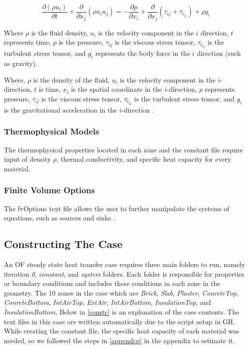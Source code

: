 \begin{equation}
\frac{\partial (\rho u_i)}{\partial t} + \frac{\partial}{\partial x_j} \left( \rho u_i u_j \right) = -\frac{\partial p}{\partial x_i} + \frac{\partial}{\partial x_j} \left( \tau_{ij} + \tau_{t_{ij}} \right) + \rho g_i
\end{equation}

Where \(\rho\) is the fluid density, \(u_i\) is the velocity component in the \(i\) direction, \(t\) represents time, \(p\) is the pressure, \(\tau_{ij}\) is the viscous stress tensor, \(\tau_{t_{ij}}\) is the turbulent stress tensor, and \(g_i\) represents the body force in the \(i\) direction (such as gravity).


Where, $\rho$ is the density of the fluid, $u_i$ is the velocity component in the $i$-direction, $t$ is time, $x_i$ is the spatial coordinate in the $i$-direction, $p$ represents pressure, $\tau_{ij}$ is the viscous stress tensor, $\tau_{t_{ij}}$ is the turbulent stress tensor, and $g_i$ is the gravitational acceleration in the $i$-direction
 \cite{cht}.


\subsubsection{Thermophysical Models}
The thermophysical properties located in each zone and the constant file require input of density $\rho$, thermal conductivity, and specific heat capacity for every material.
\subsubsection{Finite Volume Options}
The fvOptions text file allows the user to further manipulate the systems of equations, such as sources and sinks \cite{ofvoptions}.  


\subsection{Constructing The Case}    
An \gls{OF} steady state heat transfer case requires three main folders to run, namely iteration \textit{0}, \textit{constant}, and \textit{system} folders. Each folder is responsible for properties or boundary conditions and includes these conditions in each zone in the geometry. The 10 zones in the case which are \textit{Brick}, \textit{Slab}, \textit{Plaster}, \textit{ConreteTop}, \textit{ConreteBottom}, \textit{IntAirTop}, \textit{ExtAir}, \textit{IntAirBottom}, \textit{InsulationTop}, and \textit{InsulationBottom}. Below in \cref{constc} is an explanation of the case contents. The text files in this case are written automatically due to the script setup in \gls{GH}. While creating the constant file, the specific heat capacity of each material was needed, so we followed the steps in \ref{appendcp} in the appendix to estimate it.






